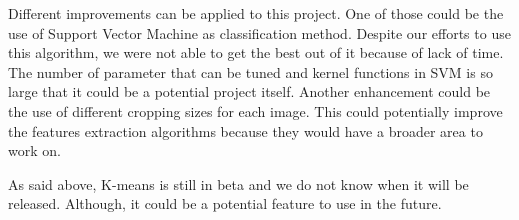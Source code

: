 \documentclass{report}
\begin{document}
Different improvements can be applied to this project. One of those could be the use of Support Vector Machine as classification method. Despite our efforts to use this algorithm, we were not able to get the best out of it because of lack of time. The number of parameter that can be tuned and kernel functions in SVM is so large that it could be a potential project itself.
Another enhancement could be the use of different cropping sizes for each image. This could potentially improve the features extraction algorithms because they would have a broader area to work on.

As said above, K-means is still in beta and we do not know when it will be released. Although, it could be a potential feature to use in the future.





\end{document}
